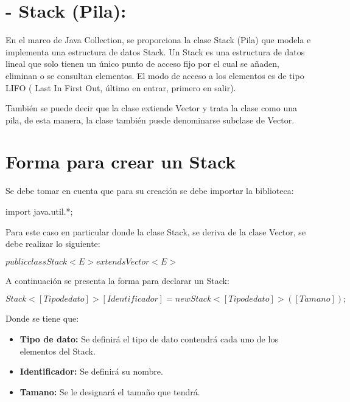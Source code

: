\documentclass[12pt, letterpaper]{article} %
\begin{document}
\section*{- Stack (Pila):}
En el marco de Java Collection, se proporciona la clase Stack (Pila) que modela e implementa una estructura de datos Stack. Un Stack es una estructura de datos lineal que solo tienen un único punto de acceso fijo por el cual se añaden, eliminan o se consultan elementos. El modo de acceso a los elementos es de tipo LIFO ( Last In First Out, último en entrar, primero en salir).
\vspace{5mm} 

También se puede decir que la clase extiende Vector y trata la clase como una pila, de esta manera, la clase también puede denominarse subclase de Vector.
\section*{Forma para crear un Stack}
Se debe tomar en cuenta que para su creación se debe importar la biblioteca:

\begin{center}
    import java.util.*;
\end{center}

Para este caso en particular donde la clase Stack, se deriva de la clase Vector, se debe realizar lo siguiente:
\begin{center}
    $public class Stack<E> extends Vector<E>$
\end{center}
A continuación se presenta la forma para declarar un Stack:
\begin{center}
    $Stack<[Tipo de dato]> [Identificador] = new Stack<[Tipo de dato]>([Tamano]);$
\end{center}
Donde se tiene que:
\begin{itemize}
    \item \textbf{Tipo de dato:} Se definirá el tipo de dato contendrá cada uno de los elementos del Stack.
    \item \textbf{Identificador:} Se definirá su nombre.
    \item \textbf{Tamano:} Se le designará el tamaño que tendrá.
\end{itemize}
\end{document}
